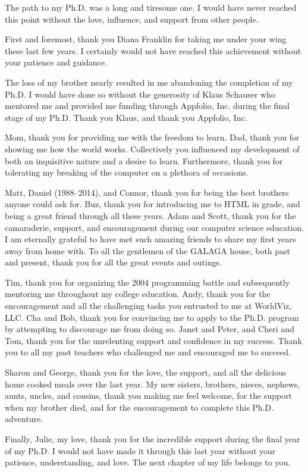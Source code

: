 \begin{acknowledgements}

The path to my Ph.D. was a long and tiresome one. I would have never reached
this point without the love, influence, and support from other people.

First and foremost, thank you Diana Franklin for taking me under your wing
these last few years. I certainly would not have reached this achievement
without your patience and guidance.

The loss of my brother nearly resulted in me abandoning the completion of my
Ph.D. I would have done so without the generosity of Klaus Schauser who
mentored me and provided me funding through Appfolio, Inc. during the final
stage of my Ph.D. Thank you Klaus, and thank you Appfolio, Inc.

Mom, thank you for providing me with the freedom to learn. Dad, thank you for
showing me how the world works. Collectively you influenced my development of
both an inquisitive nature and a desire to learn. Furthermore, thank you for
tolerating my breaking of the computer on a plethora of occasions.

Matt, Daniel (1988--2014), and Connor, thank you for being the best brothers
anyone could ask for. Buz, thank you for introducing me to HTML in 
grade, and being a great friend through all these years. Adam and Scott, thank
you for the camaraderie, support, and encouragement during our computer science
education. I am eternally grateful to have met such amazing friends to share my
first years away from home with. To all the gentlemen of the GALAGA house, both
past and present, thank you for all the great events and outings.

Tim, thank you for organizing the 2004 programming battle and subsequently
mentoring me throughout my college education. Andy, thank you for the
encouragement and all the challenging tasks you entrusted to me at WorldViz,
LLC. Cha and Bob, thank you for convincing me to apply to the Ph.D. program by
attempting to discourage me from doing so. Janet and Peter, and Cheri and Tom,
thank you for the unrelenting support and confidence in my success. Thank you
to all my past teachers who challenged me and encouraged me to succeed.

Sharon and George, thank you for the love, the support, and all the delicious
home cooked meals over the last year. My new sisters, brothers, nieces,
nephews, aunts, uncles, and cousins, thank you making me feel welcome, for the
support when my brother died, and for the encouragement to complete this
Ph.D. adventure.

Finally, Julie, my love, thank you for the incredible support during the final
year of my Ph.D. I would not have made it through this last year without your
patience, understanding, and love. The next chapter of my life belongs to you.

\end{acknowledgements}
